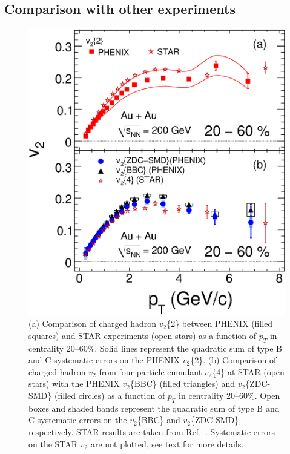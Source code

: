 \documentclass[aps,prc,superscriptaddress,showpacs,floatfix,twocolumn]{revtex4}
\newcommand \pt{\mbox{$p_T$}\xspace}
\begin{document}
\subsection{Comparison with other experiments}

\begin{figure}[htbp!]
\includegraphics[width=1.0\linewidth]{comparison_v2pt_STAR_cent20-60.eps}
\caption{\label{fig:comparison_v2pt_STAR_cent20-60}
(a) Comparison of charged hadron $v_2$\{2\} between PHENIX (filled squares) 
and STAR experiments (open stars) as a function of \pt in 
centrality 20--60\%.  Solid lines represent the quadratic sum of type B 
and C systematic errors on the PHENIX $v_2$\{2\}.
(b) Comparison of charged hadron $v_2$ from four-particle cumulant 
$v_2$\{4\} at STAR (open stars) with the PHENIX $v_2$\{BBC\} (filled 
triangles) and $v_2$\{ZDC-SMD\} (filled circles) as a function of \pt in 
centrality 20--60\%. Open boxes and shaded bands represent the quadratic 
sum of type B and C systematic errors on the $v_2$\{BBC\} and 
$v_2$\{ZDC-SMD\}, respectively. STAR results are taken from 
Ref.~\cite{Adams:2004wz}. Systematic errors on the STAR $v_2$ are not 
plotted, see text for more details.
}
\end{figure}
\end{document}
